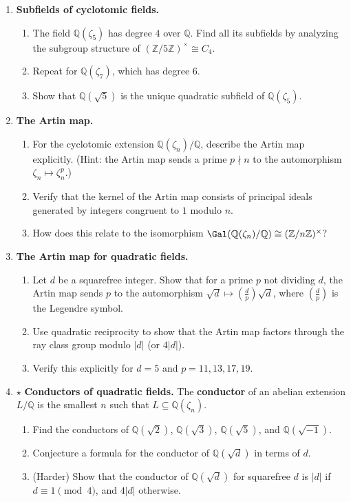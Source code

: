 \begin{enumerate}
    \item \textbf{Subfields of cyclotomic fields.}
    \begin{enumerate}
        \item The field $\mathbb{Q}(\zeta_5)$ has degree $4$ over $\mathbb{Q}$. Find all its subfields by analyzing the subgroup structure of $(\mathbb{Z}/5\mathbb{Z})^\times \cong C_4$.
        \item Repeat for $\mathbb{Q}(\zeta_7)$, which has degree $6$.
        \item Show that $\mathbb{Q}(\sqrt{5})$ is the unique quadratic subfield of $\mathbb{Q}(\zeta_5)$.
    \end{enumerate}

    \item \textbf{The Artin map.}
    \begin{enumerate}
        \item For the cyclotomic extension $\mathbb{Q}(\zeta_n)/\mathbb{Q}$, describe the Artin map explicitly. (Hint: the Artin map sends a prime $p \nmid n$ to the automorphism $\zeta_n \mapsto \zeta_n^p$.)
        \item Verify that the kernel of the Artin map consists of principal ideals generated by integers congruent to $1$ modulo $n$.
        \item How does this relate to the isomorphism $\Gal(\mathbb{Q}(\zeta_n)/\mathbb{Q}) \cong (\mathbb{Z}/n\mathbb{Z})^\times$?
    \end{enumerate}

    \item \textbf{The Artin map for quadratic fields.}
    \begin{enumerate}
        \item Let $d$ be a squarefree integer. Show that for a prime $p$ not dividing $d$, the Artin map sends $p$ to the automorphism $\sqrt{d} \mapsto \left(\frac{d}{p}\right)\sqrt{d}$, where $\left(\frac{d}{p}\right)$ is the Legendre symbol.
        \item Use quadratic reciprocity to show that the Artin map factors through the ray class group modulo $|d|$ (or $4|d|$).
        \item Verify this explicitly for $d = 5$ and $p = 11, 13, 17, 19$.
    \end{enumerate}

    \item $\star$ \textbf{Conductors of quadratic fields.}
    The \textbf{conductor} of an abelian extension $L/\mathbb{Q}$ is the smallest $n$ such that $L \subseteq \mathbb{Q}(\zeta_n)$.
    \begin{enumerate}
        \item Find the conductors of $\mathbb{Q}(\sqrt{2})$, $\mathbb{Q}(\sqrt{3})$, $\mathbb{Q}(\sqrt{5})$, and $\mathbb{Q}(\sqrt{-1})$.
        \item Conjecture a formula for the conductor of $\mathbb{Q}(\sqrt{d})$ in terms of $d$.
        \item (Harder) Show that the conductor of $\mathbb{Q}(\sqrt{d})$ for squarefree $d$ is $|d|$ if $d \equiv 1 \pmod{4}$, and $4|d|$ otherwise.
    \end{enumerate}


\end{enumerate}
